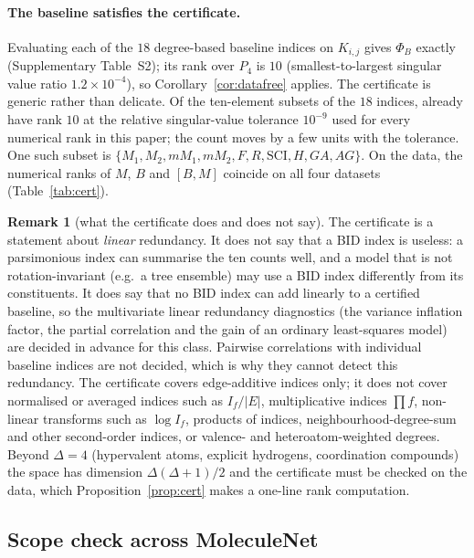 \documentclass[11pt,a4paper]{article}
\theoremstyle{definition}
\newtheorem{remark}[theorem]{Remark}
\begin{document}
\paragraph{The baseline satisfies the certificate.} Evaluating each of
the $18$ degree-based baseline indices on $K_{i,j}$ gives $\Phi_B$
exactly (Supplementary Table~S2); its rank over $P_4$ is $10$ (smallest-to-largest singular
value ratio $1.2\times10^{-4}$), so Corollary~\ref{cor:datafree}
applies. The certificate is generic rather than delicate. Of the
\nAllSubsets{} ten-element subsets of the $18$ indices,
\nGenericSubsets{} already have rank $10$ at the relative
singular-value tolerance $10^{-9}$ used for every numerical rank in
this paper; the count moves by a few units with the tolerance. One
such subset is $\{M_1,M_2,mM_1,mM_2,F,R,\mathrm{SCI},H,GA,AG\}$. On
the data, the numerical ranks of $M$, $B$ and $[B,M]$ coincide on all
four datasets (Table~\ref{tab:cert}).

\begin{remark}[what the certificate does and does not say]\label{rem:scope}
The certificate is a statement about \emph{linear} redundancy. It
does not say that a BID index is useless: a parsimonious index can
summarise the ten counts well, and a model that is not
rotation-invariant (e.g.\ a tree ensemble) may use a BID index
differently from its constituents. It does say that no BID index can
add linearly to a certified baseline, so the multivariate linear
redundancy diagnostics (the variance inflation factor, the partial
correlation and the gain of an ordinary least-squares model) are
decided in advance for this class. Pairwise correlations with
individual baseline indices are not decided, which is why they cannot
detect this redundancy.
The certificate covers edge-additive indices only; it does not
cover normalised or averaged indices such as $I_f/|E|$, multiplicative
indices $\prod f$, non-linear transforms such as $\log I_f$, products
of indices, neighbourhood-degree-sum and other second-order indices,
or valence- and heteroatom-weighted degrees. Beyond $\Delta=4$
(hypervalent atoms, explicit hydrogens, coordination compounds) the space has dimension $\Delta(\Delta+1)/2$
and the certificate must be checked on the data, which
Proposition~\ref{prop:cert} makes a one-line rank computation.
\end{remark}



\subsection{Scope check across MoleculeNet}\label{sec:general}
\end{document}
